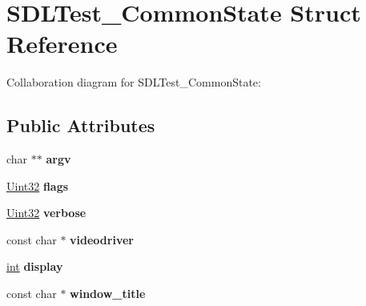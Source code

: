 \hypertarget{struct_s_d_l_test___common_state}{}\section{S\+D\+L\+Test\+\_\+\+Common\+State Struct Reference}
\label{struct_s_d_l_test___common_state}


Collaboration diagram for S\+D\+L\+Test\+\_\+\+Common\+State\+:
\subsection*{Public Attributes}
\begin{DoxyCompactItemize}
\item 
\hypertarget{struct_s_d_l_test___common_state_a6db840410b86ab7c6807763fd8bcb081}{}char $\ast$$\ast$ {\bfseries argv}\label{struct_s_d_l_test___common_state_a6db840410b86ab7c6807763fd8bcb081}

\item 
\hypertarget{struct_s_d_l_test___common_state_a97272d03558f1f74e579ec8a5cdabc5e}{}\hyperlink{_s_d_l__stdinc_8h_add440eff171ea5f55cb00c4a9ab8672d}{Uint32} {\bfseries flags}\label{struct_s_d_l_test___common_state_a97272d03558f1f74e579ec8a5cdabc5e}

\item 
\hypertarget{struct_s_d_l_test___common_state_aad4b8ebf6277cd9d3608d2e1b48e4678}{}\hyperlink{_s_d_l__stdinc_8h_add440eff171ea5f55cb00c4a9ab8672d}{Uint32} {\bfseries verbose}\label{struct_s_d_l_test___common_state_aad4b8ebf6277cd9d3608d2e1b48e4678}

\item 
\hypertarget{struct_s_d_l_test___common_state_ab3face917946465c60dc0f38f179534d}{}const char $\ast$ {\bfseries videodriver}\label{struct_s_d_l_test___common_state_ab3face917946465c60dc0f38f179534d}

\item 
\hypertarget{struct_s_d_l_test___common_state_addb3de8e2b278deed8d2309bafd30758}{}\hyperlink{_s_d_l__thread_8h_a6a64f9be4433e4de6e2f2f548cf3c08e}{int} {\bfseries display}\label{struct_s_d_l_test___common_state_addb3de8e2b278deed8d2309bafd30758}

\item 
\hypertarget{struct_s_d_l_test___common_state_a86640ebac0afe0c504c3c324d84dcc37}{}const char $\ast$ {\bfseries window\+\_\+title}\label{struct_s_d_l_test___common_state_a86640ebac0afe0c504c3c324d84dcc37}


\end{DoxyCompactItemize}
